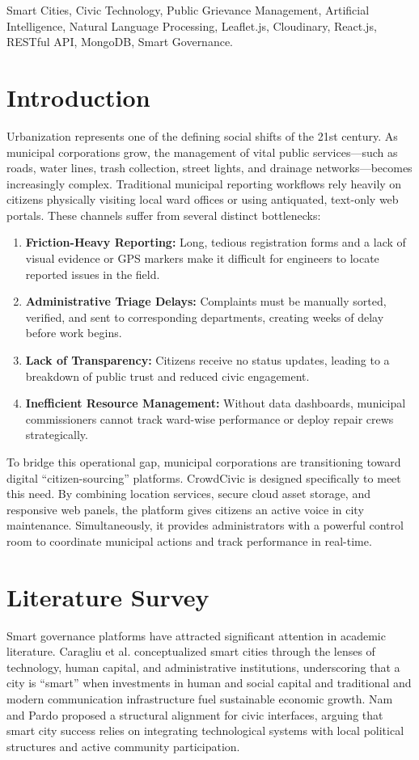 \documentclass[conference]{IEEEtran}
\begin{document}
\begin{IEEEkeywords}
Smart Cities, Civic Technology, Public Grievance Management, Artificial Intelligence, Natural Language Processing, Leaflet.js, Cloudinary, React.js, RESTful API, MongoDB, Smart Governance.
\end{IEEEkeywords}

\section{Introduction}
Urbanization represents one of the defining social shifts of the 21st century. As municipal corporations grow, the management of vital public services---such as roads, water lines, trash collection, street lights, and drainage networks---becomes increasingly complex. Traditional municipal reporting workflows rely heavily on citizens physically visiting local ward offices or using antiquated, text-only web portals. These channels suffer from several distinct bottlenecks:
\begin{enumerate}
    \item \textbf{Friction-Heavy Reporting:} Long, tedious registration forms and a lack of visual evidence or GPS markers make it difficult for engineers to locate reported issues in the field.
    \item \textbf{Administrative Triage Delays:} Complaints must be manually sorted, verified, and sent to corresponding departments, creating weeks of delay before work begins.
    \item \textbf{Lack of Transparency:} Citizens receive no status updates, leading to a breakdown of public trust and reduced civic engagement.
    \item \textbf{Inefficient Resource Management:} Without data dashboards, municipal commissioners cannot track ward-wise performance or deploy repair crews strategically.
\end{enumerate}

To bridge this operational gap, municipal corporations are transitioning toward digital ``citizen-sourcing'' platforms. CrowdCivic is designed specifically to meet this need. By combining location services, secure cloud asset storage, and responsive web panels, the platform gives citizens an active voice in city maintenance. Simultaneously, it provides administrators with a powerful control room to coordinate municipal actions and track performance in real-time.

\section{Literature Survey}
Smart governance platforms have attracted significant attention in academic literature. Caragliu et al. \cite{ref1} conceptualized smart cities through the lenses of technology, human capital, and administrative institutions, underscoring that a city is ``smart'' when investments in human and social capital and traditional and modern communication infrastructure fuel sustainable economic growth. Nam and Pardo \cite{ref2} proposed a structural alignment for civic interfaces, arguing that smart city success relies on integrating technological systems with local political structures and active community participation.
\end{document}
